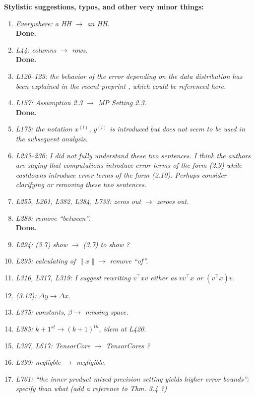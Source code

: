 \documentclass[final,onefignum,onetabnum]{siamart190516}
\begin{document}
\textbf{Stylistic suggestions, typos, and other very minor things:}
\begin{enumerate}
    \item {\it Everywhere: a HH $\rightarrow$ an HH.}\\
    {\bf Done.}
    \item {\it L44: columns $\rightarrow$ rows.}\\
    {\bf Done.}
    \item {\it L120–123: the behavior of the error depending on the data distribution has been explained in the recent preprint \cite{HighamMary2020}, which could be referenced here.}
    \item {\it L157: Assumption 2.3 $\rightarrow$ MP Setting 2.3.}\\
    {\bf Done.}
    \item {\it L175: the notation $x^{(l)}$, $y^{(l)}$ is introduced but does not seem to be used in the
subsequent analysis.}
    \item {\it L233–236: I did not fully understand these two sentences. I think the authors are saying that computations introduce error terms of the form (2.9) while castdowns introduce error terms of the form (2.10). Perhaps consider clarifying or removing these two sentences.}
    \item {\it L255, L261, L382, L384, L733: zeros out $\rightarrow$ zeroes out.}
    \item {\it L288: remove “between”.}\\
    {\bf Done.}
    \item {\it L294: (3.7) show $\rightarrow$ (3.7) to show ?}
    \item {\it L295: calculating of $\|x\|\rightarrow$ remove ``of''.}
    \item {\it L316, L317, L319: I suggest rewriting $v^{\top}xv$ either as $vv^{\top} x$ or $(v^{\top} x)v$.}
    \item {\it (3.13): $\Delta y \rightarrow \Delta x$.}
    \item {\it L375: constants, $\beta \rightarrow$ missing space.}
    \item {\it L385: $k+1^{st} \rightarrow (k+1)^{th}$, idem at L420.}
    \item {\it L397, L617: TensorCore $\rightarrow$ TensorCores ?}
    \item {\it L399: negligble $\rightarrow$ negligible.}
    \item {\it L761: “the inner product mixed precision setting yields higher error bounds”: specify than what (add a reference to Thm. 3.4 ?)}

\end{enumerate}
\end{document}
